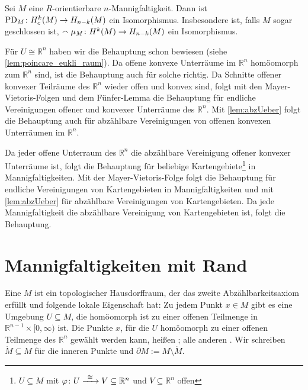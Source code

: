 \begin{satz}[{name=[Poincarés Dualitätssatz]}]
	Sei $M$ eine $R$-orientierbare $n$-Mannigfaltigkeit. 
	Dann ist $\operatorname{PD}_M \colon H^k_c(M) \to H_{n-k}(M)$ ein Isomorphismus.
	Insbesondere ist, falls $M$ sogar geschlossen ist, $\smallfrown \mu_M \colon H^k(M) \to H_{n-k}(M)$ ein Isomorphismus.
\end{satz}
\begin{beweis}
	Für $U \cong \mathbb{R}^n$ haben wir die Behauptung schon bewiesen (siehe \autoref{lem:poincare_eukli_raum}).
	Da offene konvexe Unterräume im $\mathbb{R}^n$ homöomorph zum $\mathbb{R}^n$ sind, ist die Behauptung auch für solche richtig.
	Da Schnitte offener konvexer Teilräume des $\mathbb{R}^n$ wieder offen und konvex sind, folgt mit den Mayer-Vietoris-Folgen und dem Fünfer-Lemma die Behauptung für endliche Vereinigungen offener und konvexer Unterräume des $\mathbb{R}^n$.
	Mit \autoref{lem:abzUeber} folgt die Behauptung auch für abzählbare Vereinigungen von offenen konvexen Unterräumen im $\mathbb{R}^n$.
	
	Da jeder offene Unterraum des $\mathbb{R}^n$ die abzählbare Vereinigung offener konvexer Unterräume ist, folgt die Behauptung für beliebige Kartengebiete\footnote{$U \subseteq M$ mit $\varphi \colon U \grenzw{\cong} V \subseteq \mathbb{R}^n$ und $V \subseteq \mathbb{R}^n$ offen} in Mannigfaltigkeiten.
	Mit der Mayer-Vietoris-Folge folgt die Behauptung für endliche Vereinigungen von Kartengebieten in Mannigfaltigkeiten und mit \autoref{lem:abzUeber} für abzählbare Vereinigungen von Kartengebieten.
	Da jede Mannigfaltigkeit die abzählbare Vereinigung von Kartengebieten ist, folgt die Behauptung.
\end{beweis}
\newpage

\section{Mannigfaltigkeiten mit Rand} %
\label{sec:9}
\begin{definition}[{name=[Mannigfaltigkeit mit Rand]}]
	Eine  $M$ ist ein topologischer Hausdorffraum, der das zweite Abzählbarkeitsaxiom erfüllt und folgende lokale Eigenschaft hat: 
	Zu jedem Punkt $x \in M$ gibt es eine Umgebung $U \subseteq M$, die homöomorph ist zu einer offenen Teilmenge in $\mathbb{R}^{n-1} \times [0,\infty)$ ist.
	Die Punkte $x$, für die $U$ homöomorph zu einer offenen Teilmenge des $\mathbb{R}^n$ gewählt werden kann, heißen ; alle anderen .
	Wir schreiben $\mathring{M} \subseteq M$ für die inneren Punkte und $\partial M := M \setminus \mathring{M}$.  
\end{definition}

